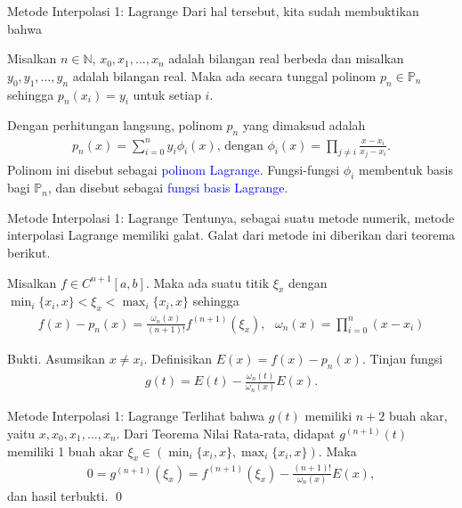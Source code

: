 \documentclass[xcolor={dvipsnames}, 9pt]{beamer}
\renewcommand{\emph}[1]{\textcolor{Blue}{#1}}
\begin{document}
    \begin{frame}{Metode Interpolasi 1: Lagrange}
        Dari hal tersebut, kita sudah membuktikan bahwa
        \begin{theorem}
            Misalkan $n\in\mathbb{N}$, $x_0,x_1,\dots,x_n$ adalah bilangan real berbeda dan misalkan $y_0,y_1,\dots,y_n$ adalah bilangan real. Maka ada secara tunggal polinom $p_n\in\mathbb{P}_n$ sehingga $p_n(x_i)=y_i$ untuk setiap $i$.
        \end{theorem}
        Dengan perhitungan langsung, polinom $p_n$ yang dimaksud adalah
        \begin{align*}
            p_n(x) = \sum_{i=0}^{n} y_i\phi_i(x) \text{, dengan } \phi_i(x)=\prod_{j\neq i} \frac{x-x_i}{x_j-x_i}.
        \end{align*}
        Polinom ini disebut sebagai \emph{polinom Lagrange}. Fungsi-fungsi $\phi_i$ membentuk basis bagi $\mathbb{P}_n$, dan disebut sebagai \emph{fungsi basis Lagrange}.
    \end{frame}
    \begin{frame}{Metode Interpolasi 1: Lagrange}
        Tentunya, sebagai suatu metode numerik, metode interpolasi Lagrange memiliki galat. Galat dari metode ini diberikan dari teorema berikut.
        \begin{theorem}
            Misalkan $f\in C^{n+1}[a,b]$. Maka ada suatu titik $\xi_x$ dengan $\min_i\{x_i,x\} < \xi_x < \max_i\{x_i,x\}$ sehingga
            \begin{align*}
                f(x)-p_n(x) = \frac{\omega_n(x)}{(n+1)!}f^{(n+1)}(\xi_x), \text{ } \omega_n(x)=\prod_{i=0}^n (x-x_i)
            \end{align*}
        \end{theorem}
        Bukti. Asumsikan $x\neq x_i$. Definisikan $E(x)=f(x)-p_n(x)$. Tinjau fungsi
        \begin{align*}
            g(t) = E(t) - \frac{\omega_n(t)}{\omega_n(x)}E(x).
        \end{align*}
    \end{frame}
    \begin{frame}{Metode Interpolasi 1: Lagrange}
        Terlihat bahwa $g(t)$ memiliki $n+2$ buah akar, yaitu $x,x_0,x_1,\dots,x_n$. Dari Teorema Nilai Rata-rata, didapat $g^{(n+1)}(t)$ memiliki 1 buah akar $\xi_x\in(\min_i\{x_i,x\},\max_i\{x_i,x\})$. Maka
        \begin{align*}
            0 = g^{(n+1)}(\xi_x) = f^{(n+1)}(\xi_x) - \frac{(n+1)!}{\omega_n(x)}E(x),
        \end{align*}
        dan hasil terbukti. \qed \newline
    \end{frame}
\end{document}
